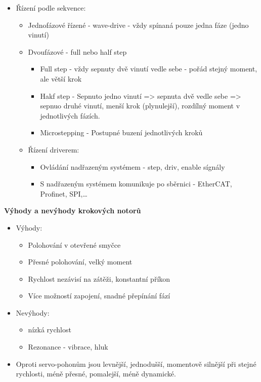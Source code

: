 \begin{itemize}
  \item Řízení podle sekvence: \begin{itemize}
    \item Jednofázové řízené - wave-drive - vždy spínaná pouze jedna fáze (jedno vinutí)
    \item Dvoufázové - full nebo half step\begin{itemize}
      \item Full step - vždy sepnuty dvě vinutí vedle sebe - pořád stejný moment, ale větší krok
      \item Hakf step - Sepnuto jedno vinutí => sepnuta dvě vedle sebe => sepnuo druhé vinutí, menší krok (plynulejší), rozdílný moment v jednotlivých fázích.
      \item Microstepping - Postupné buzení jednotlivých kroků
    \end{itemize}
  \item Řízení driverem: \begin{itemize}
    \item Ovládání nadřazeným systémem - step, driv, enable sígnály
    \item S nadřazeným systémem komunikuje po sběrnici - EtherCAT, Profinet, SPI,\dots
  \end{itemize}
  \end{itemize}
\end{itemize}

\textbf{Výhody a nevýhody krokových notorů}
\begin{itemize}
  \item Výhody: \begin{itemize}
    \item Polohování v otevřené smyčce
    \item Přesné polohování, velký moment
    \item Rychlost nezávisí na zátěži, konstantní příkon
    \item Více možností zapojení, snadné přepínání fází
  \end{itemize}
  \item Nevýhody: \begin{itemize}
    \item nízká rychlost
    \item Rezonance - vibrace, hluk
  \end{itemize}
  \item Oproti servo-pohonům jsou levnější, jednodušší, momentově silnější při stejné rychlosti, méně přesné, pomalejší, méně dynamické.
\end{itemize}

